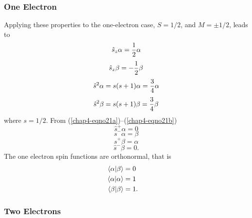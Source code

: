 \subsubsection{One Electron}

Applying these properties to the one-electron case, $S = 1/2$, and $M = 
\pm 1/2$, leads to
\begin{equation}
\hat{s}_z \alpha = {1 \over 2} \alpha
\end{equation}
\begin{equation}
\hat{s}_z \beta = - {1 \over 2} \beta
\end{equation}
\begin{equation}
\hat{s}^2 \alpha = s ( s + 1 ) \alpha = {3 \over 4} \alpha
\end{equation}
\begin{equation}
\hat{s}^2 \beta = s ( s + 1 ) \beta = {3 \over 4} \beta
\end{equation}
where $s = 1/2$.  From (\ref{chap4-eqno21a})--(\ref{chap4-eqno21b})
\begin{equation}
\hat{s}^+ \alpha = 0
\end{equation}
\begin{equation}
\hat{s}^- \alpha = \beta
\end{equation}
\begin{equation}
\hat{s}^+ \beta = \alpha
\end{equation}
\begin{equation}
\hat{s}^- \beta = 0 .
\end{equation}
The one electron spin functions are orthonormal, that is
\begin{eqnarray}
\langle \alpha | \beta \rangle &= 0\cr
\langle \alpha | \alpha \rangle &= 1\cr
\langle \beta | \beta \rangle &= 1.\cr
%
\label{chap4-eqno23}
\end{eqnarray}

\subsubsection{Two Electrons}

